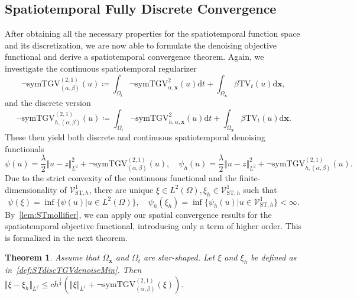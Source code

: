 \documentclass{article}
\newcommand{\dx}{\mathrm{d}}
\newcommand{\NSymTGV}{\neg \mathrm{symTGV}}
\newcommand{\TV}{\mathrm{TV}}
\newcommand{\OmegaSpace}{\Omega_\mathbf{x}}
\newcommand{\OmegaTime}{\Omega_t}
\newtheorem{theorem}{Theorem}[section]
\begin{document}
	\subsection{Spatiotemporal Fully Discrete Convergence}
	After obtaining all the necessary properties for the spatiotemporal function space and its discretization, we are now able to formulate the denoising objective functional and derive a spatiotemporal convergence theorem.
	Again, we investigate the continuous spatiotemporal regularizer
	\begin{equation}
		\label{eq:ContIntContReg}
		\NSymTGV_{(\alpha, \beta)}^{(2, 1)}(u) \coloneqq \int_{\OmegaTime} \NSymTGV_{\alpha,\mathbf{x}}^2(u) \dx t+ \int_{\OmegaSpace} \beta \TV_t(u) \dx \mathbf{x},
	\end{equation}
	and the discrete version
	\begin{equation}
		\label{eq:ContIntDiscReg}
		\NSymTGV_{h, (\alpha, \beta)}^{(2, 1)}(u) \coloneqq \int_{\OmegaTime} \NSymTGV_{h,\alpha, \mathbf{x}}^2(u) \dx t + \int_{\OmegaSpace} \beta \TV_t(u) \dx \mathbf{x}.
	\end{equation}
	These then yield both discrete and continuous spatiotemporal denoising functionals
	\begin{equation*}
		\psi(u) = \frac{\lambda}{2}\Vert u - z\Vert_{L^2}^2 +  \NSymTGV_{(\alpha, \beta)}^{(2, 1)}(u), \quad  \psi_h(u) = \frac{\lambda}{2}\Vert u - z\Vert_{L^2}^2 +  \NSymTGV_{h, (\alpha, \beta)}^{(2, 1)}(u).
	\end{equation*}
	Due to the strict convexity of the continuous functional and the finite-dimensionality of $\mathcal{V}_{\text{ST}, h}^1$, there are unique $\xi \in L^2(\Omega), \xi_{h} \in \mathcal{V}_{\text{ST}, h}^1$ such that 
	\begin{equation}
		\label{def:STdiscTGVdenoiseMin}
		\psi(\xi) = \inf \lbrace \psi(u) \rvert u \in L^2(\Omega)\rbrace, \quad\psi_h(\xi_{h}) = \inf \lbrace \psi_h(u) \rvert u \in \mathcal{V}_{\text{ST}, h}^1\rbrace  < \infty.
	\end{equation}
	By~\cref{lem:STmollifier}, we can apply our spatial convergence results for the spatiotemporal objective functional, introducing only a term of higher order.
	This is formalized in the next theorem.
	\begin{theorem}
		\label{thm:STfull_discrete_conv}
		Assume that $\OmegaSpace$ and $\OmegaTime$ are star-shaped. Let $\xi$ and $\xi_{h}$ be defined as in~\cref{def:STdiscTGVdenoiseMin}. Then
		$
		\Vert \xi - \xi_{h}\Vert_{L^2} \leq ch^{\frac{1}{4}}\left(\Vert \xi \Vert_{L^1} + \NSymTGV_{(\alpha, \beta)}^{(2, 1)}(\xi)\right).
		$
	\end{theorem}
\end{document}
